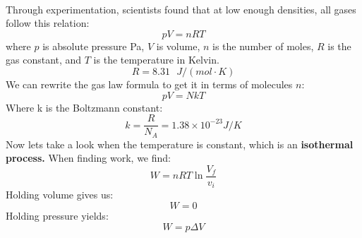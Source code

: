 \documentclass[11pt]{article}
\begin{document}
    \noindent \\Through experimentation, scientists found that at low enough densities,
    all gases follow this relation:
    \begin{equation}
        pV = nRT \tag{Ideal Gas Law}
    \end{equation}
    where $p$ is absolute pressure Pa, $V$ is volume, $n$ is the number of moles,
    $R$ is the gas constant, and $T$ is the temperature in Kelvin.
    \begin{equation}
        R = 8.31\text{ } J / (mol \cdot K) \tag{gas constant}
    \end{equation}
    We can rewrite the gas law formula to get it in terms of molecules $n$:
    \begin{equation}
        pV = NkT \tag{Ideal Gas Law}
    \end{equation}
    Where k is the Boltzmann constant:
    \begin{equation}
         k = \frac{R}{N_A} = 1.38 \times 10^{-23} J/K \tag{Boltzmann constant}
    \end{equation}
    Now lets take a look when the temperature is constant,
    which is an \textbf{isothermal process.}
    When finding work, we find:
        \begin{equation}
            W = nRT\ln\frac{V_f}{v_i} \tag{ideal gas, isothermal process}
        \end{equation}
    Holding volume gives us:
    \begin{equation}
        W = 0 \tag{constant-volume process}
    \end{equation}
    Holding pressure yields:
    \begin{equation}
        W = p \Delta V \tag{constant-pressure process}
    \end{equation}
\end{document}
